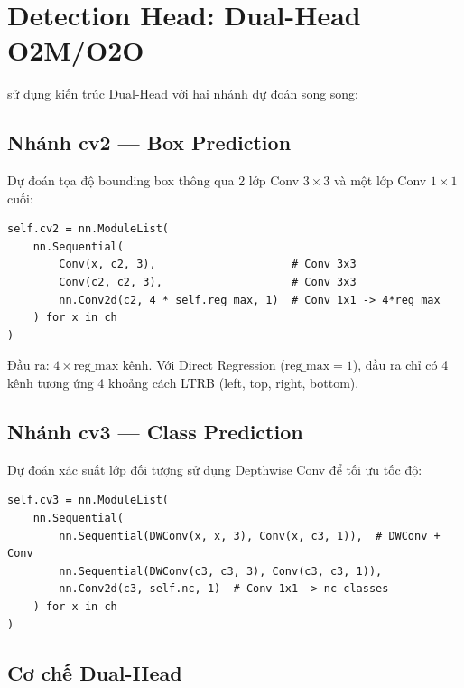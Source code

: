 \section{Detection Head: Dual-Head O2M/O2O}
\label{sec:arch_head}

\yolo sử dụng kiến trúc Dual-Head với hai nhánh dự đoán song song:

\subsection{Nhánh cv2 --- Box Prediction}

Dự đoán tọa độ bounding box thông qua 2 lớp Conv $3 \times 3$ và một lớp Conv $1 \times 1$ cuối:

\begin{lstlisting}[caption={Nhánh cv2 (Box) trong Detection Head}, label=lst:cv2]
self.cv2 = nn.ModuleList(
    nn.Sequential(
        Conv(x, c2, 3),                     # Conv 3x3
        Conv(c2, c2, 3),                    # Conv 3x3
        nn.Conv2d(c2, 4 * self.reg_max, 1)  # Conv 1x1 -> 4*reg_max
    ) for x in ch
)
\end{lstlisting}

Đầu ra: $4 \times \text{reg\_max}$ kênh. Với Direct Regression ($\text{reg\_max} = 1$), đầu ra chỉ có 4 kênh tương ứng 4 khoảng cách LTRB (left, top, right, bottom).

\subsection{Nhánh cv3 --- Class Prediction}

Dự đoán xác suất lớp đối tượng sử dụng Depthwise Conv để tối ưu tốc độ:

\begin{lstlisting}[caption={Nhánh cv3 (Class) trong Detection Head}, label=lst:cv3]
self.cv3 = nn.ModuleList(
    nn.Sequential(
        nn.Sequential(DWConv(x, x, 3), Conv(x, c3, 1)),  # DWConv + Conv
        nn.Sequential(DWConv(c3, c3, 3), Conv(c3, c3, 1)),
        nn.Conv2d(c3, self.nc, 1)  # Conv 1x1 -> nc classes
    ) for x in ch
)
\end{lstlisting}

\subsection{Cơ chế Dual-Head}

